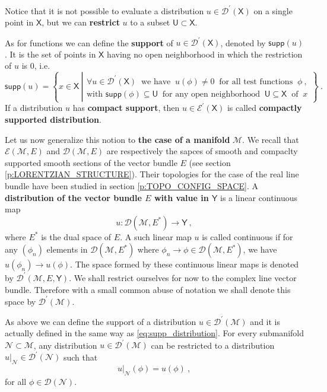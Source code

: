 \documentclass[11pt]{book}
\newcommand{\supp}{\mathsf{supp}}
\newcommand{\Dcal}{\mathcal{D}}
\newcommand{\Ecal}{\mathcal{E}}
\newcommand{\Mcal}{\mathcal{M}}
\newcommand{\Ncal}{\mathcal{N}}
\newcommand{\Usf}{\mathsf{U}}
\newcommand{\Xsf}{\mathsf{X}}
\newcommand{\Ysf}{\mathsf{Y}}
\theoremstyle{break}
\begin{document}
Notice that it is not possible to evaluate a distribution $u \in \Dcal^\prime(\Xsf)$ on a single point in $\Xsf$, but we can \textbf{restrict} $u$ to a subset $\Usf \subset \Xsf$. 


As for functions we can define the \textbf{support} of $u \in \Dcal^\prime(\Xsf)$, denoted by $\supp(u)$. It is the set of points in $\Xsf$ having no open neighborhood in which the restriction of $u$ is $0$, i.e. 
%
\begin{equation}
\supp(u) = \left\{ x \in \Xsf \ \left|
\begin{array}{l}
\forall u \in \Dcal^\prime(\Xsf) \ \mbox{ we have } \ u(\phi) \neq 0 \ \mbox{ for all test functions } \ \phi \ , \\ 
\mbox{with } \supp(\phi) \subseteq \Usf \ \mbox{ for any open neighborhood } \ \Usf \subseteq \Xsf \ \mbox{ of } \ x 
\end{array}
\right. \right\} \ .
\label{eq:supp_distribution}
\end{equation}
%
If a distribution $u$ has \textbf{compact support}, then $u \in \Ecal^\prime(\Xsf)$ is called \textbf{compactly supported distribution}. 


\bigskip


Let us now generalize this notion to \textbf{the case of a manifold} $\Mcal$. We recall that $\Ecal(\Mcal,E)$ and $\Dcal(\Mcal,E)$ are respectively the sapces of smooth and compaclty supported smooth sections of the vector bundle $E$ (see section \ref{p:LORENTZIAN_STRUCTURE}). Their topologies for the case of the real line bundle have been studied in section \ref{p:TOPO_CONFIG_SPACE}. A \textbf{distribution of the vector bundle $E$ with value in $\Ysf$} is a linear continuous map 
%
\begin{equation*}
u : \Dcal(\Mcal,E^\ast) \to \Ysf \ ,
\end{equation*}
%
where $E^\ast$ is the dual space of $E$. A such linear map $u$ is called continuous if for any $(\phi_n)$ elements in $\Dcal(\Mcal,E^\ast)$ where $\phi_n \to \phi \in \Dcal(\Mcal,E^\ast)$, we have $u(\phi_n) \to u(\phi)$. The space formed by these continuous linear maps is denoted by $\Dcal^\prime(\Mcal,E,\Ysf)$. We shall restrict ourselves for now to the complex line vector bundle. Therefore with a small common abuse of notation we shall denote this space by $\Dcal^\prime(\Mcal)$. 


As above we can define the support of a distribution $u \in \Dcal^\prime(\Mcal)$ and it is actually defined in the same way as \eqref{eq:supp_distribution}. For every submanifold $\Ncal \subset \Mcal$, any distribution $u \in \Dcal^\prime(\Mcal)$ can be restricted to a distribution $\left.u\right|_{\Ncal} \in \Dcal^\prime(\Ncal)$ such that
%
\begin{equation*}
\left.u\right|_{\Ncal}(\phi) = u(\phi) \ , 
\end{equation*}
%
for all $\phi \in \Dcal(\Ncal)$. 
\end{document}
